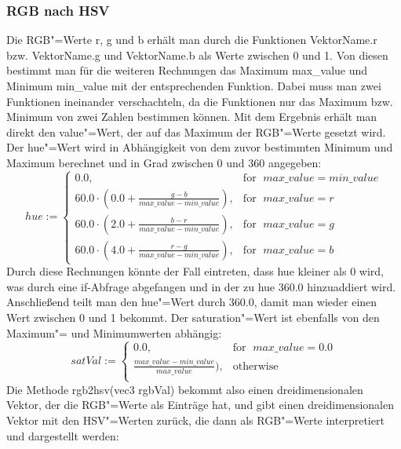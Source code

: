 \documentclass[a4paper,12pt,abstracton,titlepage]{scrartcl}
\begin{document}
\subsubsection{RGB nach HSV}
Die RGB"=Werte r, g und b erhält man durch die Funktionen VektorName.r bzw. VektorName.g und VektorName.b als Werte zwischen 0 und 1. Von diesen bestimmt man für die weiteren Rechnungen das Maximum max\_value und Minimum min\_value mit der entsprechenden Funktion. Dabei muss man zwei Funktionen ineinander verschachteln, da die Funktionen nur das Maximum bzw. Minimum von zwei Zahlen bestimmen können. Mit dem Ergebnis erhält man direkt den value"=Wert, der auf das Maximum der RGB"=Werte gesetzt wird. Der hue"=Wert wird in Abhängigkeit von dem zuvor bestimmten Minimum und Maximum berechnet und in Grad zwischen 0 und 360 angegeben:
\[    hue := \left\{\begin{array}{lr}
        0.0, & \text{for }\; max\_value = min\_value\\
        60.0 \cdot \left( 0.0 + \frac {g - b} {max\_value - min\_value} \right), & \text{for }\; max\_value = r\\
        60.0 \cdot \left( 2.0 + \frac {b - r} {max\_value - min\_value} \right), & \text{for }\; max\_value = g\\
        60.0 \cdot \left( 4.0 + \frac {r - g} {max\_value - min\_value} \right), & \text{for }\; max\_value = b
        \end{array}\right.
  \]  
Durch diese Rechnungen könnte der Fall eintreten, dass hue kleiner als 0 wird, was durch eine if-Abfrage abgefangen und in der zu hue 360.0 hinzuaddiert wird. Anschließend teilt man den hue"=Wert durch 360.0, damit man wieder einen Wert zwischen 0 und 1 bekommt.
Der saturation"=Wert ist ebenfalls von den Maximum"= und Minimumwerten abhängig:
\[
    satVal := \left\{\begin{array}{lr}
        0.0, & \text{for }\; max\_value = 0.0\\
        \frac {max\_value - min\_value} {max\_value}), & \text{otherwise }\; \\
        \end{array}\right.
  \]  
Die Methode rgb2hsv(vec3 rgbVal) bekommt also einen dreidimensionalen Vektor, der die RGB"=Werte als Einträge hat, und gibt einen dreidimensionalen Vektor mit den HSV"=Werten zurück, die dann als RGB"=Werte interpretiert und dargestellt werden:
\end{document}

